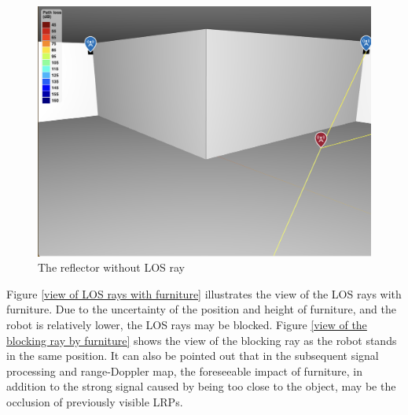 \documentclass[12pt,DIV14,BCOR12mm,a4paper,footinclude=false,headinclude,parskip=half-,twoside,openright,cleardoublepage=empty,toc=index,bibliography=totoc,listof=totoc]{scrreprt}
\numberwithin{equation}{chapter}
\begin{document}
\begin{figure}[t]
	\centering
	\includegraphics[scale=.3]{figures/LOS_with_empty_set.png}
	\caption{The reflector without LOS ray}
	\label{view of non LOS rays}
\end{figure}

Figure \ref{view of LOS rays with furniture} illustrates the view of the LOS rays with furniture. Due to the uncertainty of the position and height of furniture, and the robot is relatively lower, the LOS rays may be blocked. Figure \ref{view of the blocking ray by furniture} shows the view of the blocking ray as the robot stands in the same position. It can also be pointed out that in the subsequent signal processing and range-Doppler map, the foreseeable impact of furniture, in addition to the strong signal caused by being too close to the object, may be the occlusion of previously visible LRPs.
\end{document}
